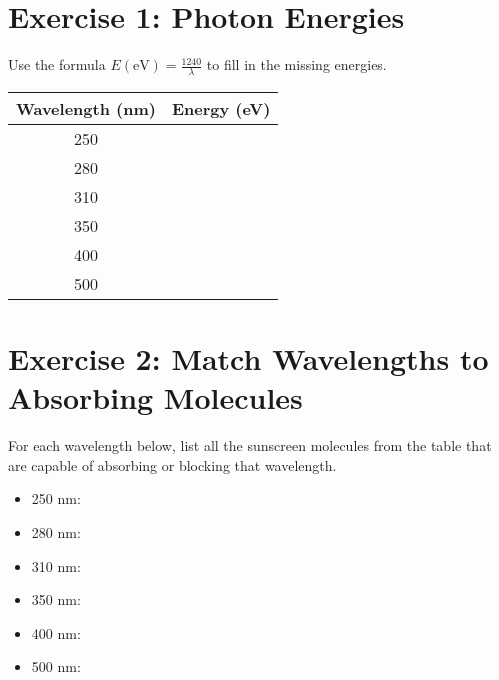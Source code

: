 \documentclass[12pt]{article}
\begin{document}
\section*{Exercise 1: Photon Energies}

Use the formula \( E(\text{eV}) = \frac{1240}{\lambda} \) to fill in the missing energies.

\begin{center}
\begin{tabular}{|c|c|}
\hline
Wavelength (nm) & Energy (eV) \\
\hline
250 & \underline{\hspace{3cm}} \\
280 & \underline{\hspace{3cm}} \\
310 & \underline{\hspace{3cm}} \\
350 & \underline{\hspace{3cm}} \\
400 & \underline{\hspace{3cm}} \\
500 & \underline{\hspace{3cm}} \\
\hline
\end{tabular}
\end{center}

\section*{Exercise 2: Match Wavelengths to Absorbing Molecules}

For each wavelength below, list all the sunscreen molecules from the table that are capable of absorbing or blocking that wavelength.

\begin{itemize}
    \item 250 nm: \underline{\hspace{10cm}}
    \item 280 nm: \underline{\hspace{10cm}}
    \item 310 nm: \underline{\hspace{10cm}}
    \item 350 nm: \underline{\hspace{10cm}}
    \item 400 nm: \underline{\hspace{10cm}}
    \item 500 nm: \underline{\hspace{10cm}}
\end{itemize}
\end{document}
